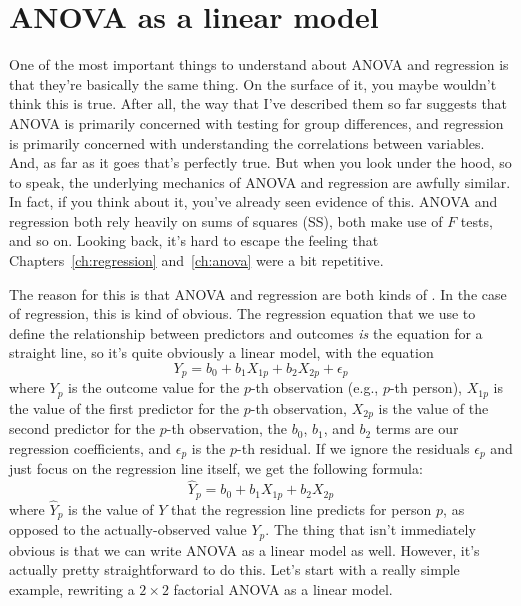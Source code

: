 \begin{comment}
\begin{rblock1}
> @usr{ms.res <- ss.res.full / 12}
> @usr{ms.diff <- ss.diff / 3 }
\end{rblock1}
Okay, now that we have our two MS values, we can divide one by the other, and obtain an $F$-statistic ...
\begin{rblock1}
> @usr{F.stat <- ms.diff / ms.res} 
> @usr{F.stat}
[1] 4.5268
\end{rblock1}
... and, just as we had hoped, this turns out to be identical to the $F$-statistic that the \rtext{anova()} function produced earlier. 


\end{comment}


\section{ANOVA as a linear model\label{sec:anovalm}}

One of the most important things to understand about ANOVA and regression is that they're basically the same thing. On the surface of it, you maybe wouldn't think this is true. After all, the way that I've described them so far suggests that ANOVA is primarily concerned with testing for group differences, and regression is primarily concerned with understanding the correlations between variables. And, as far as it goes that's perfectly true. But when you look under the hood, so to speak, the underlying mechanics of ANOVA and regression are awfully similar. In fact, if you think about it, you've already seen evidence of this. ANOVA and regression both rely heavily on sums of squares (SS), both make use of $F$ tests, and so on. Looking back, it's hard to escape the feeling that Chapters~\ref{ch:regression} and~\ref{ch:anova} were a bit repetitive. 

The reason for this is that ANOVA and regression are both kinds of . In the case of regression, this is kind of obvious. The regression equation that we use to define the relationship between predictors and outcomes {\it is} the equation for a straight line, so it's quite obviously a linear model, with the equation
$$
Y_{p} = b_0 + b_1 X_{1p} + b_2 X_{2p} + \epsilon_{p}
$$
where $Y_p$ is the outcome value for the $p$-th observation (e.g., $p$-th person), $X_{1p}$ is the value of the first predictor for the $p$-th observation, $X_{2p}$ is the value of the second predictor for the $p$-th observation, the $b_0$, $b_1$, and $b_2$ terms are our regression coefficients, and $\epsilon_{p}$ is the $p$-th residual. If we ignore the residuals $\epsilon_{p}$ and just focus on the regression line itself, we get the following formula:
$$
\hat{Y}_{p} = b_0 + b_1 X_{1p} + b_2 X_{2p} 
$$
where $\hat{Y}_p$ is the value of $Y$ that the regression line predicts for person $p$, as opposed to the actually-observed value $Y_p$. The thing that isn't immediately obvious is that we can write ANOVA as a linear model as well. However, it's actually pretty straightforward to do this. Let's start with a really simple example, rewriting a $2 \times 2$ factorial ANOVA as a linear model. 

